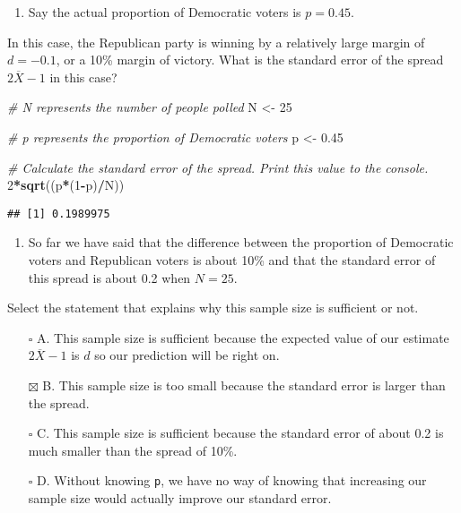 \documentclass[
]{article}
\newenvironment{Shaded}{\begin{snugshade}}{\end{snugshade}}
\newcommand{\CommentTok}[1]{\textcolor[rgb]{0.56,0.35,0.01}{\textit{#1}}}
\newcommand{\DecValTok}[1]{\textcolor[rgb]{0.00,0.00,0.81}{#1}}
\newcommand{\FloatTok}[1]{\textcolor[rgb]{0.00,0.00,0.81}{#1}}
\newcommand{\KeywordTok}[1]{\textcolor[rgb]{0.13,0.29,0.53}{\textbf{#1}}}
\newcommand{\NormalTok}[1]{#1}
\newcommand{\OperatorTok}[1]{\textcolor[rgb]{0.81,0.36,0.00}{\textbf{#1}}}
\newcommand{\StringTok}[1]{\textcolor[rgb]{0.31,0.60,0.02}{#1}}
\providecommand{\tightlist}{%
  \setlength{\itemsep}{0pt}\setlength{\parskip}{0pt}}
\begin{document}
\begin{enumerate}
\def\labelenumi{\arabic{enumi}.}
\setcounter{enumi}{8}
\tightlist
\item
  Say the actual proportion of Democratic voters is \(p = 0.45\).
\end{enumerate}

In this case, the Republican party is winning by a relatively large
margin of \(d = -0.1\), or a 10\% margin of victory. What is the
standard error of the spread \(2 \overline{X} − 1\) in this case?

\begin{Shaded}
\begin{Highlighting}[]
\CommentTok{\# \textasciigrave{}N\textasciigrave{} represents the number of people polled}
\NormalTok{N \textless{}{-}}\StringTok{ }\DecValTok{25}

\CommentTok{\# \textasciigrave{}p\textasciigrave{} represents the proportion of Democratic voters}
\NormalTok{p \textless{}{-}}\StringTok{ }\FloatTok{0.45}

\CommentTok{\# Calculate the standard error of the spread. Print this value to the console.}
\DecValTok{2}\OperatorTok{*}\KeywordTok{sqrt}\NormalTok{((p}\OperatorTok{*}\NormalTok{(}\DecValTok{1}\OperatorTok{{-}}\NormalTok{p)}\OperatorTok{/}\NormalTok{N))}
\end{Highlighting}
\end{Shaded}

\begin{verbatim}
## [1] 0.1989975
\end{verbatim}

\begin{enumerate}
\def\labelenumi{\arabic{enumi}.}
\setcounter{enumi}{9}
\tightlist
\item
  So far we have said that the difference between the proportion of
  Democratic voters and Republican voters is about 10\% and that the
  standard error of this spread is about 0.2 when \(N = 25\).
\end{enumerate}

Select the statement that explains why this sample size is sufficient or
not.

\begin{itemize}
\tightlist
\item[$\square$]
  A. This sample size is sufficient because the expected value of our
  estimate \(2 \overline{X} − 1\) is \(d\) so our prediction will be
  right on.
\item[$\boxtimes$]
  B. This sample size is too small because the standard error is larger
  than the spread.
\item[$\square$]
  C. This sample size is sufficient because the standard error of about
  0.2 is much smaller than the spread of 10\%.
\item[$\square$]
  D. Without knowing \texttt{p}, we have no way of knowing that
  increasing our sample size would actually improve our standard error.
\end{itemize}
\end{document}
